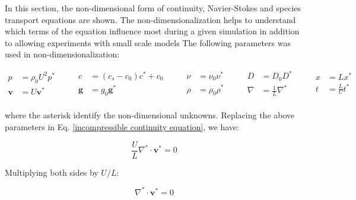 In this section, the non-dimensional form
of continuity, Navier-Stokes and
species transport equations are shown.
The non-dimensionalization helps to understand 
which terms of the equation influence most during 
a given simulation in addition to allowing experiments 
with small scale models 
The following parameters was used in non-dimensionalization:

\begin{equation}
 \begin{aligned}
  p & = \rho_{0} U^{2} p^{*} \\[10pt]
 \textbf{v} & = U \textbf{v}^{*} \\
 \end{aligned}
 \qquad
 \begin{aligned}
 c & = ( c_{s} - c_{0} ) c^{*} + c_{0}\\[10pt]
 \textbf{g} & = g_{0} \textbf{g}^{*} \\
 \end{aligned}
 \qquad
 \begin{aligned}
 \nu & = \nu_{0} \nu^{*} \\[10pt]
 \rho & = \rho_{0} \rho^{*} \\
 \end{aligned}
 \qquad
 \begin{aligned}
 D & = D_{0} D^{*} \\[5pt]
 \nabla & = \frac{1}{L} \nabla^{*} \\
 \end{aligned}
 \qquad
 \begin{aligned}
 x & = L x^{*} \\[5pt]
 t & = \frac{L}{U} t^{*} \\
 \end{aligned}
 \nonumber
\end{equation}


\medskip
\noindent
where the asterisk identify the non-dimensional unknowns.
Replacing the above parameters in Eq. \ref{incompressible
continuity equation}, we have:

\begin{equation}
 \frac{U}{L} \nabla^{*} \cdot \textbf{v}^{*} = 0
\end{equation}

\medskip
\noindent
Multiplying both sides by $U/L$:

\begin{equation} \label{continuidade adimensional 1}
 \nabla^{*} \cdot \textbf{v}^{*} = 0
\end{equation}

